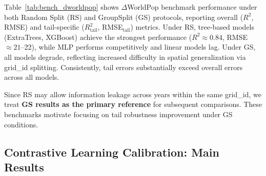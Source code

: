 \documentclass[11pt,conference,onecolumn]{IEEEtran}
\begin{document}
Table~\ref{tab:bench_dworldpop} shows $\Delta$WorldPop benchmark performance under both Random Split (RS) and GroupSplit (GS) protocols, reporting overall ($R^2$, RMSE) and tail-specific ($R^2_{\text{tail}}$, RMSE$_{\text{tail}}$) metrics. Under RS, tree-based models (ExtraTrees, XGBoost) achieve the strongest performance ($R^2 \approx 0.84$, RMSE $\approx 21$--22), while MLP performs competitively and linear models lag. Under GS, all models degrade, reflecting increased difficulty in spatial generalization via grid\_id splitting. Consistently, tail errors substantially exceed overall errors across all models.

Since RS may allow information leakage across years within the same grid\_id, we treat \textbf{GS results as the primary reference} for subsequent comparisons. These benchmarks motivate focusing on tail robustness improvement under GS conditions.


\subsection{Contrastive Learning Calibration: Main Results}
\end{document}
